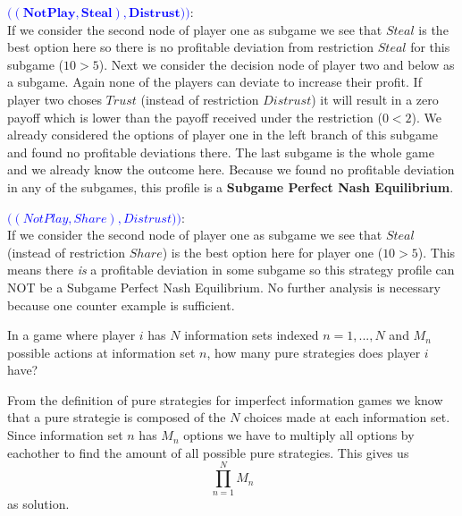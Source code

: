 \documentclass[../main.tex]{subfiles}
\begin{document}
\begin{solution}
\begin{itemize}
		\textcolor{blue}{$\mathbf{\Big((Not Play, Steal),Distrust)\Big)}$}:\\
		If we consider the second node of player one as subgame we see that $Steal$ is the best option here so there is no profitable deviation from restriction $Steal$ for this subgame ($10>5$).
		Next we consider the decision node of player two and below as a subgame.
		Again none of the players can deviate to increase their profit.
		If player two choses $Trust$ (instead of restriction $Distrust$) it will result in a zero payoff which is lower than the payoff received under the restriction ($0<2$).
		We already considered the options of player one in the left branch of this subgame and found no profitable deviations there.
		The last subgame is the whole game and we already know the outcome here.
		Because we found no profitable deviation in any of the subgames, this profile is a \textbf{Subgame Perfect Nash Equilibrium}.

		\textcolor{blue}{$\Big((Not Play, Share),Distrust)\Big)$}:\\
		If we consider the second node of player one as subgame we see that $Steal$ (instead of restriction $Share$) is the best option here for player one ($10>5$).
		This means there \emph{is} a profitable deviation in some subgame so this strategy profile can NOT be a Subgame Perfect Nash Equilibrium. 
		No further analysis is necessary because one counter example is sufficient.
\end{itemize}
\end{solution}

\begin{question}
In a game where player $i$ has $N$ information sets indexed $n = 1, ..., N$ and $M_n$ possible actions at information set $n$, how many pure strategies does player $i$ have?
\end{question}

\begin{solution}
	From the definition of pure strategies for imperfect information games  we know that a pure strategie is composed of the $N$ choices made at each information set.
	Since information set $n$ has $M_n$ options we have to multiply all options by eachother to find the amount of all possible pure strategies.
	This gives us
$$\prod\limits_{n=1}^N M_n$$
as solution. 
\end{solution}
\end{document}
